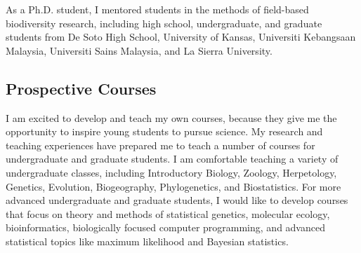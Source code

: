 As a Ph.D. student, I mentored students in the methods of field-based
biodiversity research, including high school, undergraduate, and graduate
students from De Soto High School, University of Kansas, Universiti Kebangsaan
Malaysia, Universiti Sains Malaysia, and La Sierra University.

\subsection*{Prospective Courses}

I am excited to develop and teach my own courses, because they give me the
opportunity to inspire young students to pursue science.
My research and teaching experiences have prepared me to teach a number of
courses for undergraduate and graduate students.
I am comfortable teaching a variety of undergraduate classes, including
Introductory Biology,
Zoology,
Herpetology,
Genetics,
Evolution,
Biogeography,
Phylogenetics,
and 
Biostatistics.
For more advanced undergraduate and graduate students, I would like to develop
courses that focus on theory and methods of
statistical genetics,
molecular ecology,
bioinformatics,
biologically focused computer programming,
and
advanced statistical topics like
maximum likelihood
and
Bayesian statistics.

